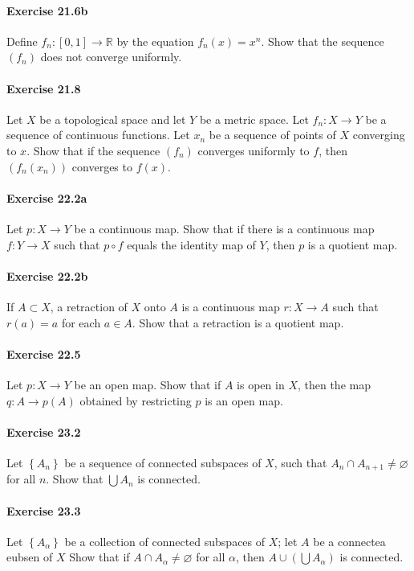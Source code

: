\documentclass{article}
\begin{document}
\paragraph{Exercise 21.6b} Define $f_{n}:[0,1] \rightarrow \mathbb{R}$ by the equation $f_{n}(x)=x^{n}$. Show that the sequence $\left(f_{n}\right)$ does not converge uniformly.

\paragraph{Exercise 21.8} Let $X$ be a topological space and let $Y$ be a metric space. Let $f_{n}: X \rightarrow Y$ be a sequence of continuous functions. Let $x_{n}$ be a sequence of points of $X$ converging to $x$. Show that if the sequence $\left(f_{n}\right)$ converges uniformly to $f$, then $\left(f_{n}\left(x_{n}\right)\right)$ converges to $f(x)$.

\paragraph{Exercise 22.2a} Let $p: X \rightarrow Y$ be a continuous map. Show that if there is a continuous map $f: Y \rightarrow X$ such that $p \circ f$ equals the identity map of $Y$, then $p$ is a quotient map.

\paragraph{Exercise 22.2b} If $A \subset X$, a retraction of $X$ onto $A$ is a continuous map $r: X \rightarrow A$ such that $r(a)=a$ for each $a \in A$. Show that a retraction is a quotient map.

\paragraph{Exercise 22.5} Let $p \colon X \rightarrow Y$ be an open map. Show that if $A$ is open in $X$, then the map $q \colon A \rightarrow p(A)$ obtained by restricting $p$ is an open map.

\paragraph{Exercise 23.2} Let $\left\{A_{n}\right\}$ be a sequence of connected subspaces of $X$, such that $A_{n} \cap A_{n+1} \neq \varnothing$ for all $n$. Show that $\bigcup A_{n}$ is connected.

\paragraph{Exercise 23.3} Let $\left\{A_{\alpha}\right\}$ be a collection of connected subspaces of $X$; let $A$ be a connectea eubsen of $X$ Show that if $A \cap A_{\alpha} \neq \varnothing$ for all $\alpha$, then $A \cup\left(\bigcup A_{\alpha}\right)$ is connected.
\end{document}
